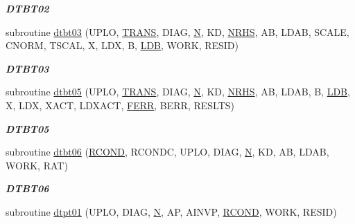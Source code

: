 \begin{DoxyCompactItemize}
\begin{DoxyCompactList}\small\item\em {\bfseries D\+T\+B\+T02} \end{DoxyCompactList}\item 
subroutine \hyperlink{group__double__lin_gaa9a722fff00cfbc5877b2fbcb2837f31}{dtbt03} (U\+P\+L\+O, \hyperlink{superlu__enum__consts_8h_a0c4e17b2d5cea33f9991ccc6a6678d62a1f61e3015bfe0f0c2c3fda4c5a0cdf58}{T\+R\+A\+N\+S}, D\+I\+A\+G, \hyperlink{polmisc_8c_a0240ac851181b84ac374872dc5434ee4}{N}, K\+D, \hyperlink{example__user_8c_aa0138da002ce2a90360df2f521eb3198}{N\+R\+H\+S}, A\+B, L\+D\+A\+B, S\+C\+A\+L\+E, C\+N\+O\+R\+M, T\+S\+C\+A\+L, X, L\+D\+X, B, \hyperlink{example__user_8c_a50e90a7104df172b5a89a06c47fcca04}{L\+D\+B}, W\+O\+R\+K, R\+E\+S\+I\+D)
\begin{DoxyCompactList}\small\item\em {\bfseries D\+T\+B\+T03} \end{DoxyCompactList}\item 
subroutine \hyperlink{group__double__lin_ga7ed410004a1229af2f9cc994bcede537}{dtbt05} (U\+P\+L\+O, \hyperlink{superlu__enum__consts_8h_a0c4e17b2d5cea33f9991ccc6a6678d62a1f61e3015bfe0f0c2c3fda4c5a0cdf58}{T\+R\+A\+N\+S}, D\+I\+A\+G, \hyperlink{polmisc_8c_a0240ac851181b84ac374872dc5434ee4}{N}, K\+D, \hyperlink{example__user_8c_aa0138da002ce2a90360df2f521eb3198}{N\+R\+H\+S}, A\+B, L\+D\+A\+B, B, \hyperlink{example__user_8c_a50e90a7104df172b5a89a06c47fcca04}{L\+D\+B}, X, L\+D\+X, X\+A\+C\+T, L\+D\+X\+A\+C\+T, \hyperlink{superlu__enum__consts_8h_af00a42ecad444bbda75cde1b64bd7e72a78fd14d7abebae04095cfbe02928f153}{F\+E\+R\+R}, B\+E\+R\+R, R\+E\+S\+L\+T\+S)
\begin{DoxyCompactList}\small\item\em {\bfseries D\+T\+B\+T05} \end{DoxyCompactList}\item 
subroutine \hyperlink{group__double__lin_gaaf3a6e0f0b5b51e1d93e3541169f7273}{dtbt06} (\hyperlink{superlu__enum__consts_8h_af00a42ecad444bbda75cde1b64bd7e72a9b5c151728d8512307565994c89919d5}{R\+C\+O\+N\+D}, R\+C\+O\+N\+D\+C, U\+P\+L\+O, D\+I\+A\+G, \hyperlink{polmisc_8c_a0240ac851181b84ac374872dc5434ee4}{N}, K\+D, A\+B, L\+D\+A\+B, W\+O\+R\+K, R\+A\+T)
\begin{DoxyCompactList}\small\item\em {\bfseries D\+T\+B\+T06} \end{DoxyCompactList}\item 
subroutine \hyperlink{group__double__lin_ga5bf76927370cbeb3a1f53fea785eb170}{dtpt01} (U\+P\+L\+O, D\+I\+A\+G, \hyperlink{polmisc_8c_a0240ac851181b84ac374872dc5434ee4}{N}, A\+P, A\+I\+N\+V\+P, \hyperlink{superlu__enum__consts_8h_af00a42ecad444bbda75cde1b64bd7e72a9b5c151728d8512307565994c89919d5}{R\+C\+O\+N\+D}, W\+O\+R\+K, R\+E\+S\+I\+D)

\end{DoxyCompactItemize}
